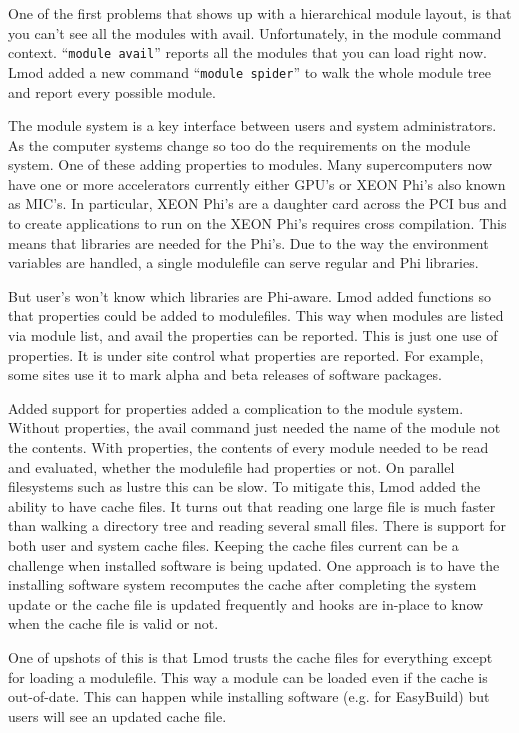 One of the first problems that shows up with a hierarchical module
layout, is that you can't see all the modules with avail.
Unfortunately, in the module command context.  ``\texttt{module avail}''
reports all the modules that you can load right now.  Lmod added a new
command ``\texttt{module spider}'' to walk the whole module tree and
report every possible module.


The module system is a key interface between users and system
administrators.  
As the computer systems change so too do the requirements on the module
system.  One of these adding properties to modules.  Many
supercomputers now have one or more accelerators currently either GPU's
or XEON Phi's also known as MIC's.   In particular, XEON Phi's are a
daughter card across the PCI bus and to create applications to run on
the XEON Phi's requires cross compilation.  This means that libraries
are needed for the Phi's.  Due to the way the environment variables
are handled, a single modulefile can serve regular and Phi libraries.

But user's won't know which libraries are Phi-aware.  Lmod added
functions so that properties could be added to modulefiles.  This way
when modules are listed via module list, and avail the properties can
be reported.  This is just one use of properties.  It is under site
control what properties are reported.  For example, some sites use it
to mark alpha and beta releases of software packages.

Added support for properties added a complication to the module
system.  Without properties, the avail command just needed the name of
the module not the contents.  With properties, the contents of every
module needed to be read and evaluated, whether the modulefile had
properties or not. On parallel filesystems such as lustre this can be
slow.  To mitigate this, Lmod added the ability to have cache files.
It turns out that reading one large file is much faster than walking a
directory tree and reading several small files.  There is support for
both user and system cache files.  Keeping the cache files current can
be a challenge when installed software is being updated.  One approach
is to have the installing software system recomputes the cache after
completing the system update or the cache file is updated frequently
and hooks are in-place to know when the cache file is valid or not.

One of upshots of this is that Lmod trusts the cache files for
everything except for loading a modulefile.  This way a module can be
loaded even if the cache is out-of-date.  This can happen while
installing software (e.g. for EasyBuild) but users will see an updated
cache file.

